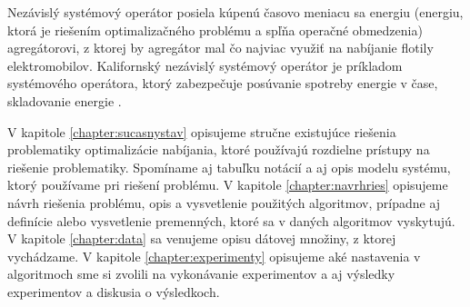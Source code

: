 Nezávislý systémový operátor posiela kúpenú časovo meniacu sa energiu (energiu, ktorá je riešením optimalizačného problému a spľňa operačné obmedzenia) agregátorovi, z ktorej by agregátor mal čo najviac využiť na nabíjanie flotily elektromobilov. Kalifornský nezávislý systémový operátor je príkladom systémového operátora, ktorý zabezpečuje posúvanie spotreby energie v čase, skladovanie energie \cite{Li_information_aggregation,li2020realtimeflexibilityfeedbackclosedloop,machine-learning-dr-systematic-review}.

V kapitole \ref{chapter:sucasnystav} opisujeme stručne existujúce riešenia problematiky optimalizácie nabíjania, ktoré používajú rozdielne prístupy na riešenie problematiky. Spomíname aj tabuľku notácií a aj opis modelu systému, ktorý používame pri riešení problému.
V kapitole \ref{chapter:navrhries} opisujeme návrh riešenia problému, opis a vysvetlenie použitých algoritmov, prípadne aj definície alebo vysvetlenie premenných, ktoré sa v daných algoritmov vyskytujú. V kapitole \ref{chapter:data} sa venujeme opisu dátovej množiny, z ktorej vychádzame.
V kapitole \ref{chapter:experimenty} opisujeme aké nastavenia v algoritmoch sme si zvolili na vykonávanie experimentov a aj výsledky experimentov a diskusia o výsledkoch.












